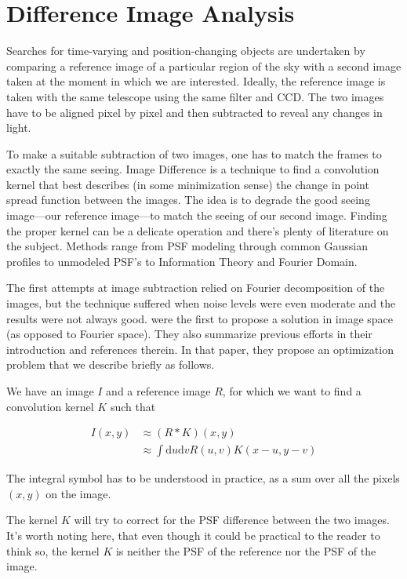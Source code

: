 \chapter{Difference Image Analysis}

Searches for time-varying and position-changing objects are undertaken by comparing a reference image of a particular region of the sky with a second image taken at the moment in which we are interested. Ideally, the reference image is taken with the same telescope using the same filter and CCD. The two images have to be aligned pixel by pixel and then subtracted to reveal any changes in light.

To make a suitable subtraction of two images, one has to match the frames to exactly the same seeing. Image Difference is a technique to find a convolution kernel that best describes (in some minimization sense) the change in point spread function between the images. The idea is to degrade the good seeing image---our reference image---to match the seeing of our second image. Finding the proper kernel can be a delicate operation and there's plenty of literature on the subject. Methods range from PSF modeling through common Gaussian profiles to unmodeled PSF's to Information Theory and Fourier Domain.

The first attempts at image subtraction relied on Fourier decomposition of the images, 
but the technique suffered when noise levels were even moderate and the results were not always good.
\citet{1998ApJ...503..325A} were the first to propose a solution in image space (as opposed to Fourier space). 
They also summarize previous efforts in their introduction and references therein. 
In that paper, they propose an optimization problem that we describe briefly as follows.

We have an image $I$ and a reference image $R$, for which we want to find a convolution kernel $K$ such that

\begin{align}
I(x,y) & \approx (R \mathbin{*} K)(x,y) \\
 & \approx \int \mathrm{d}u \mathrm{d}v {R (u,v) K(x-u,y-v)}
\end{align}
 
The integral symbol has to be understood in practice, as a sum over all the pixels $(x,y)$ on the image. 

The kernel $K$ will try to correct for the PSF difference between the two images.
It's worth noting here, that even though it could be practical to the reader to think so, the kernel $K$ is neither the PSF of the reference nor the PSF of the image.

